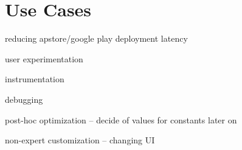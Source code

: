 \section{Use Cases}



reducing apstore/google play deployment latency

user experimentation

instrumentation

debugging

post-hoc optimization -- decide of values for constants later on

non-expert customization -- changing UI
